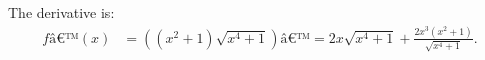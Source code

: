 The derivative is:
\begin{align*}
fâ€™(x) &= \left( (x^2+1) \sqrt{x^4+1} \right)â€™
= 2x\sqrt{x^4+1} + \frac{2x^3(x^2+1)}{\sqrt{x^4+1}}.
\end{align*}

